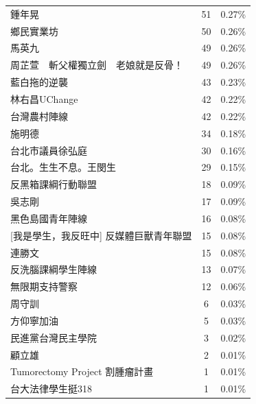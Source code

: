 \documentclass[letterpaper, 10pt, conference]{ieeeconf}   %
\begin{document}
\begin{CJK}{UTF8}{bsmi}
\begin{longtable}[c]{@{}lcc@{}}
鍾年晃 & 51 & 0.27\% \\
鄉民實業坊 & 50 & 0.26\% \\
馬英九 & 49 & 0.26\% \\
周芷萱　斬父權獨立劍　老娘就是反骨！ & 49 & 0.26\% \\
藍白拖的逆襲 & 43 & 0.23\% \\
林右昌UChange & 42 & 0.22\% \\
台灣農村陣線 & 42 & 0.22\% \\
施明德 & 34 & 0.18\% \\
台北市議員徐弘庭 & 30 & 0.16\% \\
台北。生生不息。王閔生 & 29 & 0.15\% \\
反黑箱課綱行動聯盟 & 18 & 0.09\% \\
吳志剛 & 17 & 0.09\% \\
黑色島國青年陣線 & 16 & 0.08\% \\
{[}我是學生，我反旺中{]} 反媒體巨獸青年聯盟 & 15 & 0.08\% \\
連勝文 & 15 & 0.08\% \\
反洗腦課綱學生陣線 & 13 & 0.07\% \\
無限期支持警察 & 12 & 0.06\% \\
周守訓 & 6 & 0.03\% \\
方仰寧加油 & 5 & 0.03\% \\
民進黨台灣民主學院 & 3 & 0.02\% \\
顧立雄 & 2 & 0.01\% \\
Tumorectomy Project 割腫瘤計畫 & 1 & 0.01\% \\
台大法律學生挺318 & 1 & 0.01\% \\* \bottomrule
\end{longtable}


\end{CJK}
\end{document}
